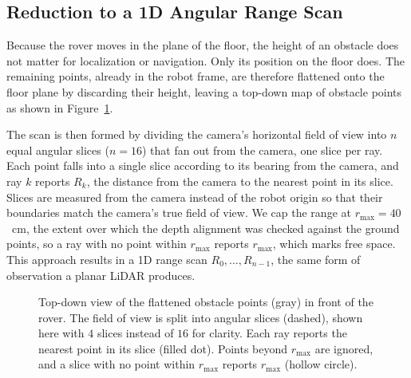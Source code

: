 \subsection{Reduction to a 1D Angular Range Scan}
\label{sec:range-scan}

Because the rover moves in the plane of the floor, the height of an obstacle does not matter for
localization or navigation. Only its position on the floor does. The remaining points, already in the robot frame, are therefore
flattened onto the floor plane by discarding their height,
leaving a top-down map of obstacle points as shown in Figure~\ref{fig:range-scan}.

The scan is then formed by dividing the camera's horizontal field of view into $n$ equal angular
slices ($n = 16$) that fan out from the camera, one slice per ray. Each point falls into a single
slice according to its bearing from the camera, and ray $k$ reports $R_k$, the distance from the
camera to the nearest point in its slice. Slices are measured from the camera instead of the robot
origin so that their boundaries match the camera's true field of view. We cap the range at
$r_{\max} = 40$~cm, the extent over which the depth alignment was checked against the ground
points, so a ray with no point within $r_{\max}$ reports $r_{\max}$, which marks free space. This
approach
results in a 1D range scan $R_0, \dots, R_{n-1}$, the same form of observation a planar LiDAR
produces.

\begin{figure}[htbp]
  \centering
  
  \caption[Reduction of the point cloud to a range scan]{Top-down view of the flattened obstacle
    points (gray) in front of the rover. The field of view is split into angular slices (dashed),
    shown here with $4$ slices instead of $16$ for clarity. Each ray reports the nearest point in
    its slice (filled dot). Points beyond $r_{\max}$ are ignored, and a slice with no point within
    $r_{\max}$ reports $r_{\max}$ (hollow circle).}
  \label{fig:range-scan}
\end{figure}


